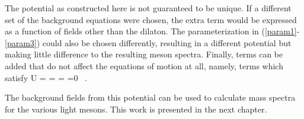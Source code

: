 The potential as constructed here is not guaranteed to be unique.
If a different set of the background equations were chosen, the extra term would be expressed as a function of fields other than the dilaton.
The parameterization in (\ref{param1}-\ref{param3}) could also be chosen differently, resulting in a different potential but making little difference to the resulting meson spectra.
Finally, terms can be added that do not affect the equations of motion at all, namely, terms which satisfy 
\be
\Delta U = \Delta {} = \Delta {} = \Delta {} =0 \, .
\ee

The background fields from this potential can be used to calculate mass spectra for the various light mesons.
This work is presented in the next chapter.


